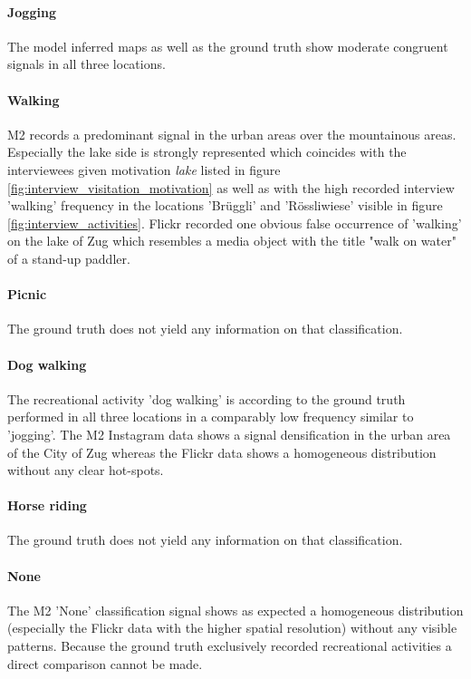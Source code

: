 \paragraph*{Jogging}
The model inferred maps as well as the ground truth show moderate congruent signals in all three locations.

\paragraph*{Walking}
M2 records a predominant signal in the urban areas over the mountainous areas. Especially the lake side is strongly represented which coincides with the interviewees given motivation \textit{lake} listed in figure \ref{fig:interview_visitation_motivation} as well as with the high recorded interview 'walking' frequency in the locations 'Br\"uggli' and 'R\"ossliwiese' visible in figure \ref{fig:interview_activities}. Flickr recorded one obvious false occurrence of 'walking' on the lake of Zug which resembles a media object with the title "walk on water" of a stand-up paddler.

\paragraph*{Picnic}
The ground truth does not yield any information on that classification.

\paragraph*{Dog walking}
The recreational activity 'dog walking' is according to the ground truth performed in all three locations in a comparably low frequency similar to 'jogging'. The M2 Instagram data shows a signal densification in the urban area of the City of Zug whereas the Flickr data shows a homogeneous distribution without any clear hot-spots.

\paragraph*{Horse riding}
The ground truth does not yield any information on that classification.

\paragraph*{None} The M2 'None' classification signal shows as expected a homogeneous distribution (especially the Flickr data with the higher spatial resolution) without any visible patterns. Because the ground truth exclusively recorded recreational activities a direct comparison cannot be made.

